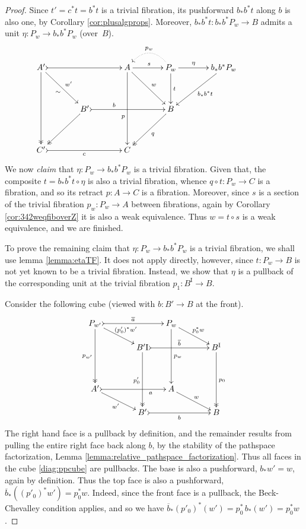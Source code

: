 \documentclass[11pt,reqno]{amsart}
\newcommand{\ra}{\ensuremath{\rightarrow}}
\newcommand{\I}{\ensuremath{\mathrm{I}}}
\theoremstyle{remark}
\theoremstyle{definition}
\begin{document}
\begin{proof}
Since $t' = c^*t = b^*t$ is a trivial fibration, its pushforward $b_*b^*t$ along $b$ is also one, by Corollary \ref{cor:plusalgprops}.  Moreover, $b_*b^*t : b_*b^*P_w \ra B$ admits a unit $\eta : P_w \ra  b_*b^*P_w$ (over~$B$).  
\begin{equation}\label{diag:EEPfactored3}
\xymatrix@=1.5em{
A' \ar@{->>}[dddd] \ar[rrdd]_{\sim}^{w'} \ar@{>->}[rrrr] && && A \ar[dddd]_>>>>>>>>>>>>p \ar[rrdd]^{w} \ar[rr]^s && \ar@{.>}@/_1.5pc/[ll]_{p_w} P_w \ar[dd]^t \ar[rr]^-\eta && b_*b^*P_w \ar[lldd]^{b_*b^*t}\\
\\
&& B' \ar@{->>}[lldd] \ar@{>->}[rrrr]^<<<<<<<<<<b  &&&& B \ar@{->>}[lldd]^q &&&& \\
\\
C' \ar@{>->}[rrrr]_c &&&& C &&&&
}
\end{equation}
We now \emph{claim} that $\eta : P_w \ra  b_*b^*P_w$ is a trivial fibration.  Given that,  the composite $t = b_*b^*t \circ \eta$ is also a trivial fibration, whence $q\circ t : P_w \ra C$ is a fibration, and so its retract $p:A\ra C$ is a fibration.  Moreover, since $s$ is a section of the trivial fibration $p_w: P_w\ra A$ between fibrations, again by Corollary \ref{cor:342weqfiboverZ} it is also a weak equivalence. Thus $w=t\circ s$ is a weak equivalence, and we are finished. 

To prove the remaining claim that $\eta : P_w \ra  b_*b^*P_w$ is a trivial fibration, we shall use lemma \ref{lemma:etaTF}.  It does not apply directly, however, since $t : P_w \ra B$ is not yet known to be a trivial fibration.  Instead, we show that $\eta$ is a pullback of the corresponding unit at the trivial fibration $p_1 : B^\I \ra B$.

Consider the following cube (viewed with $b:B'\ra B$ at the front).
\begin{equation}\label{diag:ppcube}
\xymatrix@=1.5em{
P_{w'} \ar@{->>}[ddd]_{p_{w'}} \ar[rrd]^{(p'_0)^*w'} \ar@{>->}[rrr]^{\overline{a}}
		&&& P_w \ar[ddd]^{p_w} \ar[rrd]^{p_0^*w} &&\\
&& B'^\I \ar@{->>}[ddd]_{p'_0} \ar@{>->}[rrr]^{\overline{b}}  
		&&& B^\I \ar@{->>}[ddd]^{p_0} \\
\\
A' \ar@{>->}[rrr]_>>>>>>>a  \ar[rrd]_{w'}
		&&& A \ar[rrd]^{w} &&\\
&& B'\ar@{>->}[rrr]_b &&& B
}
\end{equation}
The right hand face is a pullback by definition, and the remainder results from pulling the entire right face back along $b$, by the stability of the pathspace factorization, Lemma \ref{lemma:relative_pathspace_factorization}. Thus all faces in the cube \eqref{diag:ppcube}
are pullbacks.  The base is also a pushforward, $b_*w'=w$, again by definition.  Thus the top face is also a pushforward, $\overline{b}_*((p'_0)^*w')=p_0^*w$. Indeed, since the front face is a pullback, the Beck-Chevalley condition applies, and so we have $\overline{b}_*(p'_0)^*(w') = p_0^*\,b_*(w') = p_0^*w$.


\end{proof}
\end{document}
